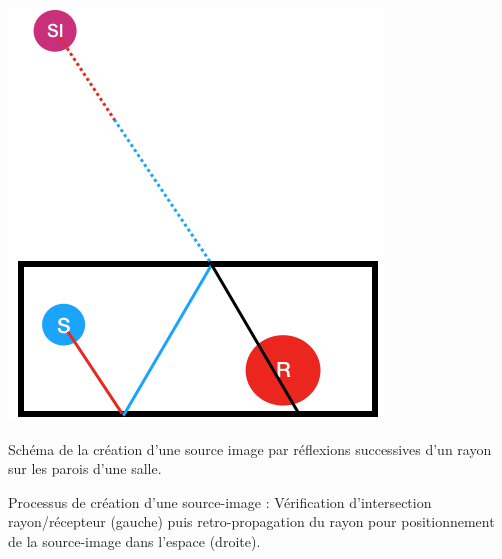 \begin{figureth}
\begin{subfigureth}{0.35\textwidth}
			\includegraphics[width=\linewidth]{images/schema_SI}
			\caption{Schéma de la création d'une source image par réflexions successives d'un rayon sur les parois d'une salle.}
			\label{schema_SI}
	\end{subfigureth}
	\caption{Processus de création d'une source-image : Vérification d'intersection rayon/récepteur (gauche) puis retro-propagation du rayon pour positionnement de la source-image dans l'espace (droite).}
\end{figureth}
%
